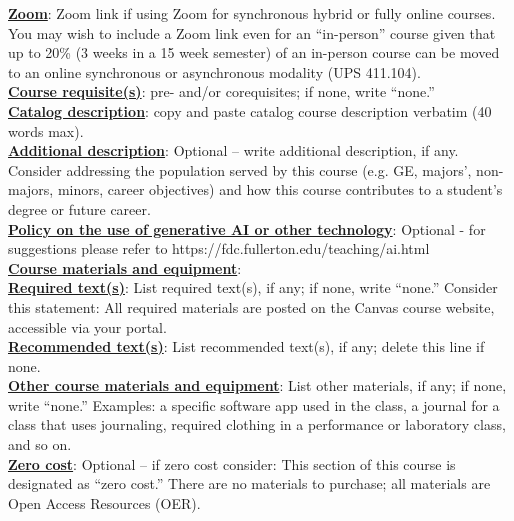 \documentclass[12pt]{article}
\begin{document}
\vspace{0.5em}
\noindent \textbf{\underline{Zoom}}: Zoom link if using Zoom for synchronous hybrid or fully online courses. {\color{annotationblue}You may wish to include a Zoom link even for an ``in-person'' course given that up to 20\% (3 weeks in a 15 week semester) of an in-person course can be moved to an online synchronous or asynchronous modality (UPS 411.104).}
\vspace{0.5em} \\
\noindent \textbf{\underline{Course requisite(s)}}: pre- and/or corequisites; if none, write ``none.''
\vspace{0.5em} \\
\noindent \textbf{\underline{Catalog description}}: copy and paste catalog course description verbatim (40 words max).
\vspace{0.5em} \\
\noindent \textbf{\underline{Additional description}}: {\color{annotationblue}Optional -- write additional description, if any. Consider addressing the population served by this course (e.g. GE, majors', non-majors, minors, career objectives) and how this course contributes to a student's degree or future career.}
\vspace{0.5em} \\
\noindent \textbf{\underline{Policy on the use of generative AI or other technology}}: {\color{annotationblue}Optional - for suggestions please refer to https://fdc.fullerton.edu/teaching/ai.html}
\vspace{0.5em} \\
\noindent \textbf{\underline{Course materials and equipment}}:
\vspace{0.5em} \\
\noindent \textbf{\underline{Required text(s)}}: List required text(s), if any; if none, write ``none.'' {\color{suggestionred}Consider this statement: All required materials are posted on the Canvas course website, accessible via your portal.}
\vspace{0.5em} \\
\noindent \textbf{\underline{Recommended text(s)}}: {\color{annotationblue}List recommended text(s), if any; delete this line if none.}
\vspace{0.5em} \\
\noindent \textbf{\underline{Other course materials and equipment}}: List other materials, if any; if none, write ``none.'' {\color{annotationblue}Examples: a specific software app used in the class, a journal for a class that uses journaling, required clothing in a performance or laboratory class, and so on.}
\vspace{0.5em} \\
\noindent \textbf{\underline{Zero cost}}: {\color{annotationblue}Optional -- if zero cost consider:} {\color{suggestionred}This section of this course is designated as ``zero cost.'' There are no materials to purchase; all materials are Open Access Resources (OER).}
\end{document}
